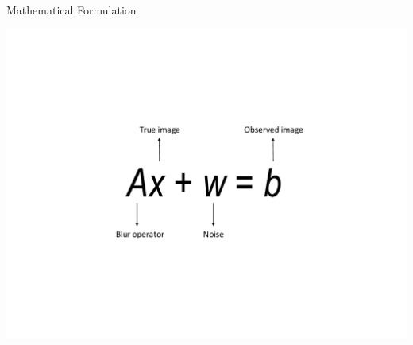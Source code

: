 \documentclass[12pt]{beamer}
\begin{document}
\begin{frame}{Mathematical Formulation}
\begin{center}
\includegraphics[scale=0.75]{../figures/linearModel}
\end{center}
\end{frame}

%
%
%
%
\end{document}
